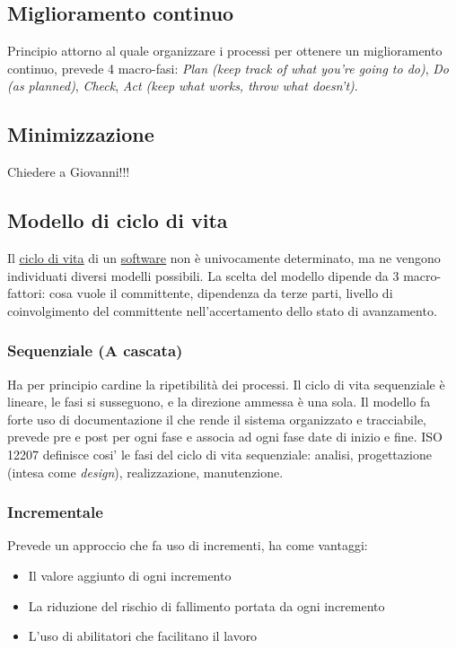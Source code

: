 	\subsection{Miglioramento continuo}
	\label{sec:miglioramentocontinuo}
	Principio attorno al quale organizzare i processi per ottenere un miglioramento continuo, prevede 4 macro-fasi:
	\emph{Plan (keep track of what you're going to do)}, \emph{Do (as planned)}, \emph{Check}, \emph{Act (keep what works, throw what doesn't)}.

	\subsection{Minimizzazione}
	Chiedere a Giovanni!!!

	\subsection{Modello di ciclo di vita}
	\label{sec:modelliciclodivita}
	Il \underline{\hyperref[sec:ciclodivita]{ciclo di vita}} di un \underline{\hyperref[sec:prodottosoftware]{software}} non è univocamente determinato, ma ne vengono individuati diversi modelli possibili. La scelta del modello dipende da 3 macro-fattori: cosa vuole il committente, dipendenza da terze parti, livello di coinvolgimento del committente nell'accertamento dello stato di avanzamento.

		\subsubsection{Sequenziale (A cascata)}
			Ha per principio cardine la ripetibilità dei processi.
			Il ciclo di vita sequenziale è lineare, le fasi si susseguono, e la direzione
			ammessa è una sola.
			Il modello fa forte uso di documentazione il che rende il sistema organizzato e tracciabile, prevede pre e post per ogni fase e associa ad ogni fase date di inizio e fine.
ISO 12207 definisce cosi' le fasi del ciclo di vita sequenziale: analisi, progettazione (intesa come \textit{design}), realizzazione, manutenzione.

		\subsubsection{Incrementale}
			Prevede un approccio che fa uso di incrementi, ha come vantaggi:
			\begin{itemize}
			\item Il valore aggiunto di ogni incremento
			\item La riduzione del rischio di fallimento portata da ogni incremento
			\item L'uso di abilitatori che facilitano il lavoro
			\end{itemize}

